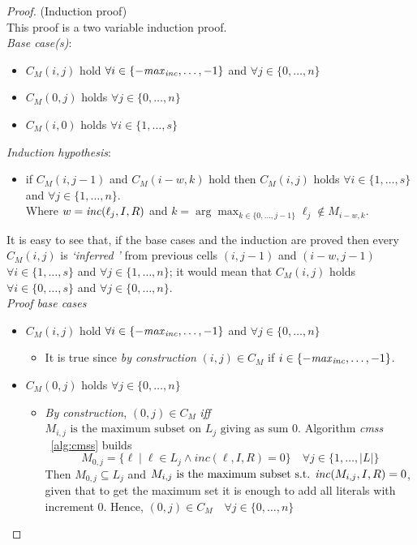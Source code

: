 \begin{proof}(Induction proof)\\
   This proof is a two variable induction proof.\\
   \textit{Base case(s)}:
   \begin{itemize}
        \item $C_M(i,j)$ hold $\forall i \in \{-\mathit{max}_{\mathit{inc}}, \hdots, -1\}$ and $\forall j \in \{0, \hdots, n\}$ 
        \item $C_M(0,j)$ holds $\forall j \in \{0, \hdots, n\}$ 
        \item $C_M(i,0)$ holds $\forall i \in \{1, \hdots, s\}$
   \end{itemize}
   \textit{Induction hypothesis}:
   \begin{itemize}
        \item if $C_M(i,j-1)$ and $C_M(i-w,k)$ hold then $C_M(i,j)$ holds $\forall i \in \{1,\hdots,s\}$
        and $\forall j \in \{1, \hdots, n\}$.
        \\ Where $w = \mathit{inc}(\ell_j,I,R)$ and $k = \arg \max_{k \in \{0,\hdots,j-1\}} \ell_j \not\in M_{i-w,k}$.
   \end{itemize}
   It is easy to see that, if the base cases  and the induction are proved then 
   every $C_M(i,j)$ is \textit{`inferred '} from previous cells $(i,j-1)$ and $(i-w,j-1)$ 
   $\forall i \in \{1,\hdots,s\}$ and $\forall j \in \{1, \hdots, n\}$;
   it would mean that $C_M(i,j)$ holds $\forall i \in \{0,\hdots,s\}$ and $\forall j \in \{0, \hdots, n\}$.\\
   \textit{Proof base cases}
   \begin{itemize}
    \item $C_M(i,j)$ hold $\forall i \in \{-\mathit{max}_{\mathit{inc}}, \hdots, -1\}$ and $\forall j \in \{0, \hdots, n\}$ 
    \begin{itemize}
        \item It is true since \textit{by construction} $(i,j) \in C_M$ if $i \in \{-\mathit{max}_{\mathit{inc}}, \hdots, -1\}$.
    \end{itemize}
    \item $C_M(0,j)$ holds $\forall j \in \{0, \hdots, n\}$ 
    \begin{itemize}
        \item \textit{By construction}, $(0,j) \in C_M$ \textit{iff}
        $M_{i,j} \text{ is the maximum subset on } L_j \text{ giving as sum } 0$.
        Algorithm \textit{cmss} ~\eqref{alg:cmss} builds 
        $$M_{0,j} = \{ \ell \mid \ell \in L_j \land inc(\ell,I,R) = 0\} \quad \forall j \in \{1, \hdots , |L|\}$$
        Then $M_{0,j} \subseteq L_j$ and
        $M_{i,j} \text{ is the maximum subset s.t. } \mathit{inc}(M_{i,j},I,R) = 0$,
        given that to get the maximum set it is enough to add all literals with increment 0.
        Hence, $(0,j) \in C_M \quad \forall j \in \{0, \hdots, n\}$ 


\end{itemize}
\end{itemize}
\end{proof}
